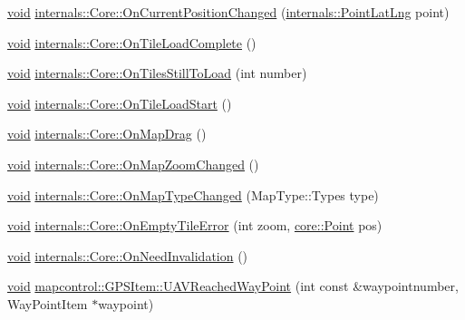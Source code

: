 \begin{DoxyCompactItemize}
\item 
\hyperlink{group___u_a_v_objects_plugin_ga444cf2ff3f0ecbe028adce838d373f5c}{void} \hyperlink{group___o_p_map_widget_ga2491a90fa3143792bc6f14153750d5d2}{internals\-::\-Core\-::\-On\-Current\-Position\-Changed} (\hyperlink{structinternals_1_1_point_lat_lng}{internals\-::\-Point\-Lat\-Lng} point)
\item 
\hyperlink{group___u_a_v_objects_plugin_ga444cf2ff3f0ecbe028adce838d373f5c}{void} \hyperlink{group___o_p_map_widget_gac03cc68ae31948f87512df9b4b25a104}{internals\-::\-Core\-::\-On\-Tile\-Load\-Complete} ()
\item 
\hyperlink{group___u_a_v_objects_plugin_ga444cf2ff3f0ecbe028adce838d373f5c}{void} \hyperlink{group___o_p_map_widget_ga8fbc5fa54e3d35c3008d0117c998638e}{internals\-::\-Core\-::\-On\-Tiles\-Still\-To\-Load} (int number)
\item 
\hyperlink{group___u_a_v_objects_plugin_ga444cf2ff3f0ecbe028adce838d373f5c}{void} \hyperlink{group___o_p_map_widget_gae5debcd025be8ef286b44c846bcf307d}{internals\-::\-Core\-::\-On\-Tile\-Load\-Start} ()
\item 
\hyperlink{group___u_a_v_objects_plugin_ga444cf2ff3f0ecbe028adce838d373f5c}{void} \hyperlink{group___o_p_map_widget_ga86c23f03f213d9cdd416259faa5e1835}{internals\-::\-Core\-::\-On\-Map\-Drag} ()
\item 
\hyperlink{group___u_a_v_objects_plugin_ga444cf2ff3f0ecbe028adce838d373f5c}{void} \hyperlink{group___o_p_map_widget_ga79ea52272693c681261bee7f02cdd9a4}{internals\-::\-Core\-::\-On\-Map\-Zoom\-Changed} ()
\item 
\hyperlink{group___u_a_v_objects_plugin_ga444cf2ff3f0ecbe028adce838d373f5c}{void} \hyperlink{group___o_p_map_widget_ga9be685397ee72f5e1ecc2694b61d0819}{internals\-::\-Core\-::\-On\-Map\-Type\-Changed} (\-Map\-Type\-::\-Types type)
\item 
\hyperlink{group___u_a_v_objects_plugin_ga444cf2ff3f0ecbe028adce838d373f5c}{void} \hyperlink{group___o_p_map_widget_ga0b750ffa3c184237b9625bdb9fa8c2c8}{internals\-::\-Core\-::\-On\-Empty\-Tile\-Error} (int zoom, \hyperlink{structcore_1_1_point}{core\-::\-Point} pos)
\item 
\hyperlink{group___u_a_v_objects_plugin_ga444cf2ff3f0ecbe028adce838d373f5c}{void} \hyperlink{group___o_p_map_widget_gaa550210d61bf033b3dd3d73fbfd7d8f9}{internals\-::\-Core\-::\-On\-Need\-Invalidation} ()
\item 
\hyperlink{group___u_a_v_objects_plugin_ga444cf2ff3f0ecbe028adce838d373f5c}{void} \hyperlink{group___o_p_map_widget_ga1631e3c57b806164009c3cf0b06bc32e}{mapcontrol\-::\-G\-P\-S\-Item\-::\-U\-A\-V\-Reached\-Way\-Point} (int const \&waypointnumber, \-Way\-Point\-Item $\ast$waypoint)

\end{DoxyCompactItemize}
